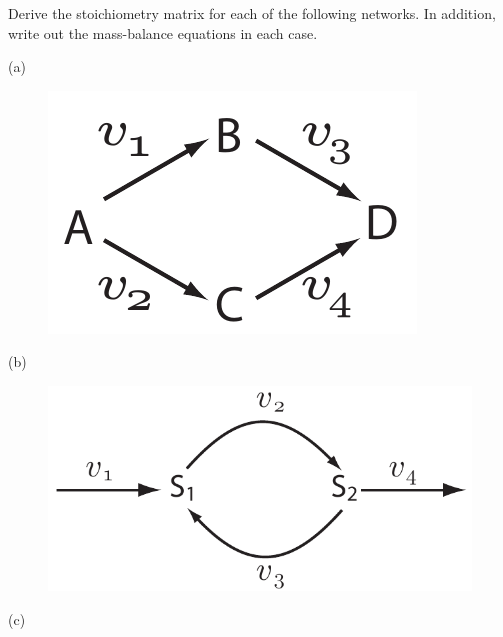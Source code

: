 \documentclass[12pt]{article}
\begin{document}
\begin{question}
Derive the stoichiometry matrix for each of the following networks. In addition, write out the mass-balance equations
in each case.

(a)
\begin{figure}[H]
\centering
  \includegraphics[scale = 0.5]{NetStructExercises1}
\end{figure}
\vspace{-20pt}
(b)
\begin{figure}[H]
\centering
  \includegraphics[scale = 0.5]{futileCycle}
\end{figure}
\vspace{-20pt}
(c) \begin{figure}[H]
\centering

\end{figure}
\end{question}
\end{document}
